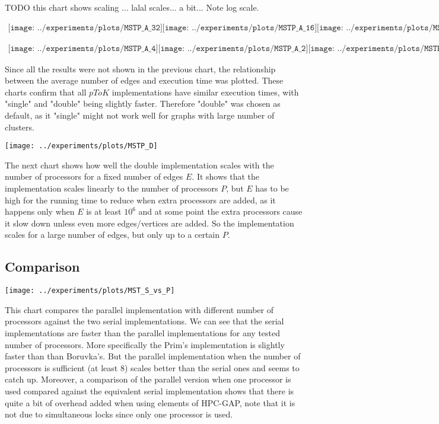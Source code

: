 \documentclass{report}
\theoremstyle{plain}
\theoremstyle{definition}
\theoremstyle{remark}
\begin{document}
TODO this chart shows scaling ... lalal scales... a bit... Note log scale.

\begin{center}
$
\begin{array}{cc}
\texttt{[image: ../experiments/plots/MSTP\_A\_32]}
\texttt{[image: ../experiments/plots/MSTP\_A\_16]}
\texttt{[image: ../experiments/plots/MSTP\_A\_8]}
\end{array}
$

\center
$
\begin{array}{cc}
\texttt{[image: ../experiments/plots/MSTP\_A\_4]}
\texttt{[image: ../experiments/plots/MSTP\_A\_2]}
\texttt{[image: ../experiments/plots/MSTP\_A\_1]}
\end{array}
$
\end{center}

Since all the results were not shown in the previous chart, the relationship between the average number of edges and execution time was plotted. These charts confirm that all $pToK$ implementations have similar execution times, with "single" and "double" being slightly faster. Therefore "double" was chosen as default, as it "single" might not work well for graphs with large number of clusters.

\texttt{[image: ../experiments/plots/MSTP\_D]}

The next chart shows how well the double implementation scales with the number of processors for a fixed number of edges $E$. It shows that the implementation scales linearly to the number of processors $P$, but $E$ has to be high for the running time to reduce when extra processors are added, as it happens only when $E$ is at least $10^6$ and at some point the extra processors cause it slow down unless even more edges/vertices are added. So the implementation scales for a large number of edges, but only up to a certain $P$.

\subsection{Comparison}

\texttt{[image: ../experiments/plots/MST\_S\_vs\_P]}

This chart compares the parallel implementation with different number of processors against the two serial implementations. We can see that the serial implementations are faster than the parallel implementations for any tested number of processors. More specifically the Prim's implementation is slightly faster than than Boruvka's. But the parallel implementation when the number of processors is sufficient (at least 8) scales better than the serial ones and seems to catch up. Moreover, a comparison of the parallel version when one processor is used compared against the equivalent serial implementation shows that there is quite a bit of overhead added when using elements of HPC-GAP, note that it is not due to simultaneous locks since only one processor is used.
\end{document}
